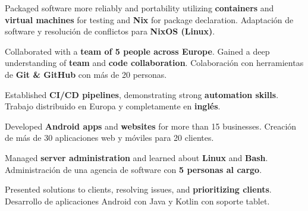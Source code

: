 \documentclass[]{cv}
\begin{document}
\begin{minipage}[t][0pt]{\linewidth}
\begin{minipage}[t]{0.57\textwidth}
\begin{tightemize}
\item \dumblang
  {Packaged software more reliably and portability utilizing \textbf{containers} and \textbf{virtual machines} for testing and \textbf{Nix} for package declaration.}
  {Adaptación de software y resolución de conflictos para \textbf{NixOS (Linux)}.}
\item \dumblang
  {Collaborated with a \textbf{team of 5 people across Europe}. Gained a deep understanding of \textbf{team} and \textbf{code collaboration}.}
  {Colaboración con herramientas de \textbf{Git \& GitHub} con más de 20 personas.}
\item \dumblang
  {Established \textbf{CI/CD pipelines}, demonstrating strong \textbf{automation skills}.}
  {Trabajo distribuido en Europa y completamente en \textbf{inglés}.}
\end{tightemize}


\begin{tightemize}
\item \dumblang
  {Developed \textbf{Android apps} and \textbf{websites} for more than 15 businesses.}
  {Creación de más de 30 aplicaciones web y móviles para 20 clientes.}
\item \dumblang
  {Managed \textbf{server administration} and learned about \textbf{Linux} and \textbf{Bash}.}
  {Administración de una agencia de software con \textbf{5 personas al cargo}.}
\item \dumblang
  {Presented solutions to clients, resolving issues, and \textbf{prioritizing clients}.}
  {Desarrollo de aplicaciones Android con Java y Kotlin con soporte tablet.}
\end{tightemize}


\end{minipage}
\end{minipage}
\end{document}
